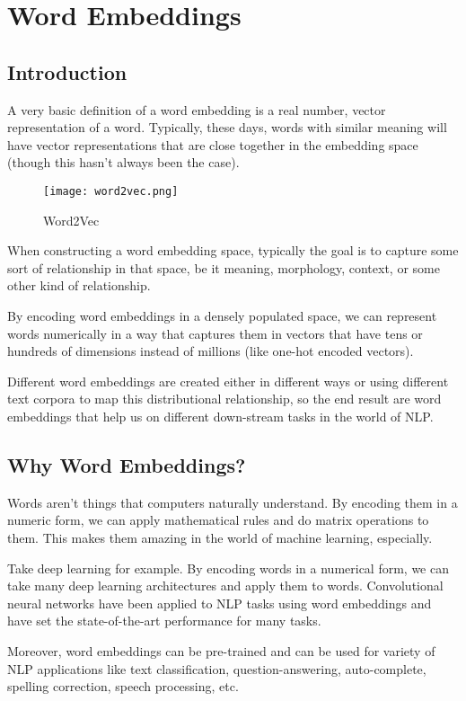 \chapter{Word Embeddings}
\section{Introduction}
A very basic definition of a word embedding is a real number, vector representation of a word. Typically, these days, words with similar meaning will have vector representations that are close together in the embedding space (though this hasn\rq t always been the case).

\begin{figure}[H]
    \centering
    \texttt{[image: word2vec.png]}
    \caption{Word2Vec}
    \label{fig:word2vec}
\end{figure}

When constructing a word embedding space, typically the goal is to capture some sort of relationship in that space, be it meaning, morphology, context, or some other kind of relationship.

By encoding word embeddings in a densely populated space, we can represent words numerically in a way that captures them in vectors that have tens or hundreds of dimensions instead of millions (like one-hot encoded vectors).

Different word embeddings are created either in different ways or using different text corpora to map this distributional relationship, so the end result are word embeddings that help us on different down-stream tasks in the world of NLP.

\section{Why Word Embeddings? }
Words aren\rq t things that computers naturally understand. By encoding them in a numeric form, we can apply mathematical rules and do matrix operations to them. This makes them amazing in the world of machine learning, especially.

Take deep learning for example. By encoding words in a numerical form, we can take many deep learning architectures and apply them to words. Convolutional neural networks have been applied to NLP tasks using word embeddings and have set the state-of-the-art performance for many tasks.

Moreover, word embeddings can be pre-trained and can be used for variety of NLP applications like text classification, question-answering, auto-complete, spelling correction, speech processing, etc.


